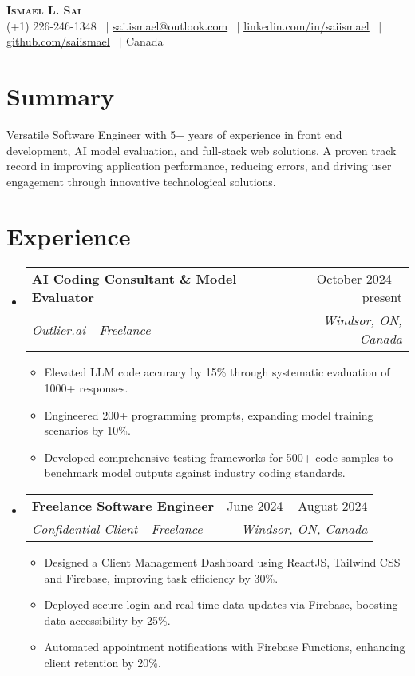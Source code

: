 \documentclass[letterpaper,11pt]{article}
\makeatletter
\newcommand{\resumeItem}[1]{\item\small{#1 \vspace{-2pt}}}
\newcommand{\resumeSubheading}[4]{
  \vspace{-2pt}\item
    \begin{tabular*}{0.97\textwidth}[t]{l@{\extracolsep{\fill}}r}
      \textbf{#1} & #2 \\
      \textit{\small#3} & \textit{\small #4} \\
    \end{tabular*}\vspace{-7pt}
}
\newcommand{\resumeSubHeadingListStart}{\begin{itemize}[leftmargin=0.15in, label={}]}
\newcommand{\resumeSubHeadingListEnd}{\end{itemize}}
\newcommand{\resumeItemListStart}{\begin{itemize}}
\newcommand{\resumeItemListEnd}{\end{itemize}\vspace{-5pt}}
\makeatother
\begin{document}
\begin{center}
    \textbf{\Huge \scshape Ismael L. Sai} \\ \vspace{1pt}
    (+1) 226-246-1348 \, $|$ \underline{\href{mailto:sai.ismael@outlook.com}{sai.ismael@outlook.com}} \, $|$ \underline{\href{https://linkedin.com/in/saiismael}{linkedin.com/in/saiismael}} \, $|$ \underline{\href{https://github.com/saiismael}{github.com/saiismael}} \, $|$ Canada
\end{center}

\section{Summary}
    \small{
   Versatile Software Engineer with 5+ years of experience in front end development, AI model evaluation, and full-stack web solutions. A proven track record in improving application performance, reducing errors, and driving user engagement through innovative technological solutions.
    }

\section{Experience}

  \resumeSubHeadingListStart
    \resumeSubheading
      {AI Coding Consultant \& Model Evaluator}{October 2024 -- present}
      {Outlier.ai - Freelance}{Windsor, ON, Canada}
    \resumeItemListStart
        \resumeItem{Elevated LLM code accuracy by 15\% through systematic evaluation of 1000+ responses.}
        \resumeItem{Engineered 200+ programming prompts, expanding model training scenarios by 10\%.}
        \resumeItem{Developed comprehensive testing frameworks for 500+ code samples to benchmark model outputs against industry coding standards.}
    \resumeItemListEnd
  \resumeSubHeadingListEnd

  \resumeSubHeadingListStart
    \resumeSubheading
      {Freelance Software Engineer}{June 2024 -- August 2024}
      {Confidential Client - Freelance}{Windsor, ON, Canada}
    \resumeItemListStart
        \resumeItem{Designed a Client Management Dashboard using ReactJS, Tailwind CSS and Firebase, improving task efficiency by 30\%.}
        \resumeItem{Deployed secure login and real-time data updates via Firebase, boosting data accessibility by 25\%.}
        \resumeItem{Automated appointment notifications with Firebase Functions, enhancing client retention by 20\%.}    
    \resumeItemListEnd
  \resumeSubHeadingListEnd
  
\end{document}
